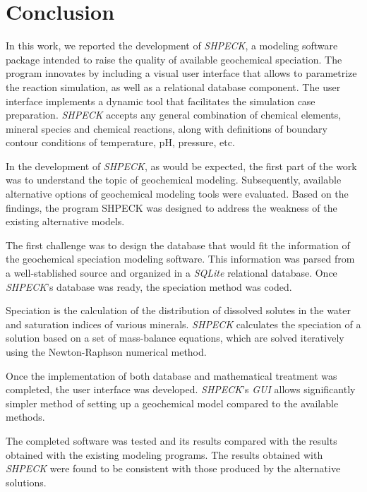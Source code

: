 
\chapter{Conclusion}
\label{chapter:conclusion}

In this work, we reported the development of \emph{SHPECK}, a modeling software package intended to raise the quality of available geochemical speciation. The program innovates by including a visual user interface that allows to parametrize the reaction simulation, as well as a relational database component. The user interface implements a dynamic tool that facilitates the simulation case preparation. \emph{SHPECK} accepts any general combination of chemical elements, mineral species and chemical reactions, along with definitions of boundary contour conditions of temperature, pH, pressure, etc.

In the development of \emph{SHPECK}, as would be expected, the first part of the work was to understand the topic of geochemical modeling. Subsequently, available alternative options of geochemical modeling tools were evaluated. Based on the findings, the program SHPECK was designed to address the weakness of the existing alternative models. 

The first challenge was to design the database that would fit the information of the geochemical speciation modeling software. This information was parsed from a well-stablished source and organized in a \emph{SQLite} relational database. Once \emph{SHPECK}'s database was ready, the speciation method was coded.

Speciation is the calculation of the distribution of dissolved solutes in the water and saturation indices of various minerals. \emph{SHPECK} calculates the speciation of a solution based on a set of mass-balance equations, which are solved iteratively using the Newton-Raphson numerical method.

Once the implementation of both database and mathematical treatment was completed, the user interface was developed. \emph{SHPECK}'s \emph{GUI} allows significantly simpler method of setting up a geochemical model compared to the available methods.

The completed software was tested and its results compared with the results obtained with the existing modeling programs.  The results obtained with \emph{SHPECK} were found to be consistent with those produced by the alternative solutions.


